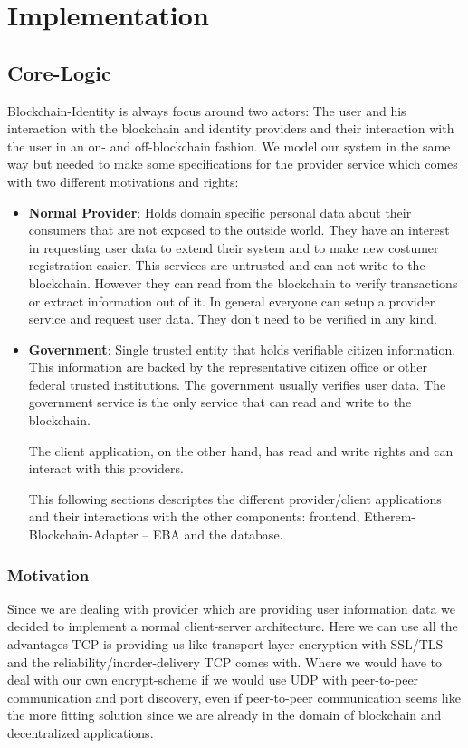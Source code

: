 \chapter{Implementation}
\label{cha:implementation}

\section{Core-Logic}
Blockchain-Identity is always focus around two actors: The user and his interaction with the blockchain and identity providers and their interaction with the user in an on- and off-blockchain fashion. We model our system in the same way but needed to make some specifications for the provider service which comes with two different motivations and rights:

\begin{itemize}
\item \textbf{Normal Provider}: Holds domain specific personal data about their consumers that are not exposed to the outside world. They have an interest in requesting user data to extend their system and to make new costumer registration easier. This services are untrusted and can not write to the blockchain. However they can read from the blockchain to verify transactions or extract information out of it. In general everyone can setup a provider service and request user data. They don’t need to be verified in any kind. 
\item \textbf{Government}: Single trusted entity that holds verifiable citizen information. This information are backed by the representative citizen office or other federal trusted institutions. The government usually verifies user data.
The government service is the only service that can read and write to the blockchain. 

The client application, on the other hand, has read and write rights and can interact with this providers.

This following sections descriptes the different provider/client applications and their interactions with the other components: frontend, Etherem-Blockchain-Adapter – EBA and the database.
\end{itemize}

\subsection{Motivation}
Since we are dealing with provider which are providing user information data we decided to implement a normal client-server architecture. Here we can use all the advantages TCP is providing us like transport layer encryption with SSL/TLS and the reliability/inorder-delivery TCP comes with. Where we would have to deal with our own encrypt-scheme if we would use UDP with peer-to-peer communication and port discovery, even if peer-to-peer communication seems like the more fitting solution since we are already in the domain of blockchain and decentralized applications. 

